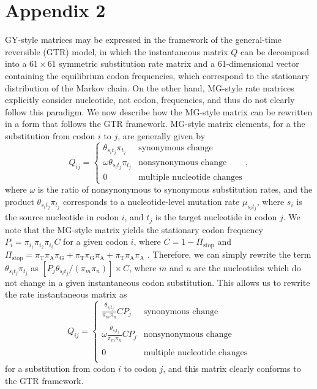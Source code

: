 \documentclass[11pt]{article}
\begin{document}
\section*{Appendix 2}
GY-style matrices may be expressed in the framework of the general-time reversible (GTR) model, in which the instantaneous matrix $Q$ can be decomposd into a $61 \times 61$ symmetric substitution rate matrix and a 61-dimensional vector containing the equilibrium codon frequencies, which correspond to the stationary distribution of the Markov chain. On the other hand, MG-style rate matrices explicitly consider nucleotide, not codon, frequencies, and thus do not clearly follow this paradigm. We now describe how the MG-style matrix can be rewritten in a form that follows the GTR framework. 
MG-style matrix elements, for a the substitution from codon $i$ to $j$, are generally given by 
\begin{equation}\label{eq:MGstyle}
Q_{ij} = \left\{ 
\begin{array}{rl}
\theta_{s_it_j}\pi_{t_j}          &\mbox{synonymous change} \\
\omega \theta_{s_it_j}\pi_{t_j}   &\mbox{nonsynonymous change} \\
0                             &\mbox{multiple nucleotide changes}       
\end{array} \right. ,
\end{equation} where $\omega$ is the ratio of nonsynonymous to synonymous substitution rates, and the product $\theta_{s_it_j}\pi_{t_j}$ corresponds to a nucleotide-level mutation rate $\mu_{s_it_j}$, where $s_i$ is the source nucleotide in codon $i$, and $t_j$ is the target nucleotide in codon $j$. We note that the MG-style matrix yields the stationary codon frequency $P_i = \pi_{i_1}\pi_{i_2}\pi_{i_3}C$ for a given codon $i$, where $C = 1 - \Pi_\text{stop}$ and $\Pi_\text{stop} = \pi_\text{T}\pi_\text{A}\pi_\text{G} + \pi_\text{T}\pi_\text{G}\pi_\text{A} + \pi_\text{T}\pi_\text{A}\pi_\text{A}$ \cite{MuseGaut1994}. Therefore, we can simply rewrite the term $\theta_{s_it_j}\pi_{t_j}$ as $[P_j\theta_{s_it_j} / (\pi_m\pi_n)] \times C$, where $m$ and $n$ are the nucleotides which do not change in a given instantaneous codon substitution. This allows us to rewrite the rate instantaneous matrix as 
\begin{equation}
Q_{ij} = \left\{ 
\begin{array}{rl}
\frac{\theta_{s_it_j}}{\pi_m\pi_n}C P_j           &\mbox{synonymous change} \\\\
\omega\frac{\theta_{s_it_j}}{\pi_m\pi_n}C P_j     &\mbox{nonsynonymous change} \\\\
0                                              &\mbox{multiple nucleotide changes} \\           
\end{array} \right.
\end{equation} for a substitution from codon $i$ to codon $j$, and this matrix clearly conforms to the GTR framework.
		
\end{document}
